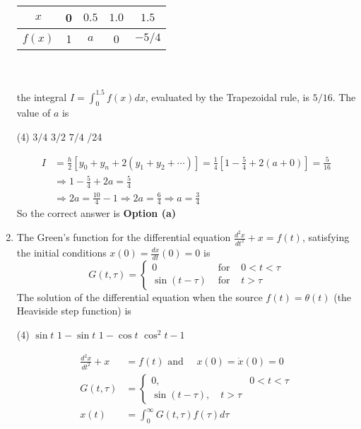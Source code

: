 \begin{enumerate}
\begin{tabular}{|c|c|c|c|c|}
	\hline$x$ & 0 & $0.5$ & $1.0$ & $1.5$ \\
	\hline$f(x)$ & 1 & $a$ & 0 & $-5 / 4$ \\
	\hline
\end{tabular}\\\\
the integral $I=\int_{0}^{1.5} f(x) d x$, evaluated by the Trapezoidal rule, is $5 / 16$. The value of $a$ is
 \begin{tasks}(4)
	\task[\textbf{a.}]$3 / 4$
	\task[\textbf{b.}]$3 / 2$
	\task[\textbf{c.}] $7 / 4$
	/24
\end{tasks}
\begin{answer}
	\begin{align*}
	I&=\frac{h}{2}\left[y_{0}+y_{n}+2\left(y_{1}+y_{2}+\cdots\right)\right]=\frac{1}{4}\left[1-\frac{5}{4}+2(a+0)\right]=\frac{5}{16}\\
	&\Rightarrow 1-\frac{5}{4}+2 a=\frac{5}{4} \\
	&\Rightarrow 2 a=\frac{10}{4}-1 \Rightarrow 2 a=\frac{6}{4} \Rightarrow a=\frac{3}{4}
	\end{align*}
		So the correct answer is \textbf{Option (a)}
\end{answer}
\item The Green's function for the differential equation $\frac{d^{2} x}{d t^{2}}+x=f(t)$, satisfying the initial conditions $x(0)=\frac{d x}{d t}(0)=0$ is
$$
G(t, \tau)=\left\{\begin{array}{llc}
0 & \text { for } & 0<t<\tau \\
\sin (t-\tau) & \text { for } & t>\tau
\end{array}\right.
$$
The solution of the differential equation when the source $f(t)=\theta(t)$ (the Heaviside step function) is
 \begin{tasks}(4)
	\task[\textbf{a.}]$\sin t$
	\task[\textbf{b.}]$1-\sin t$
	\task[\textbf{c.}]$1-\cos t$
	\task[\textbf{d.}]$\cos ^{2} t-1$ 
\end{tasks}
\begin{answer}
	\begin{align*}
	\frac{d^{2} x}{d t^{2}}+x&=f(t) \text { and } \quad x(0)=\dot{x}(0)=0\\
	G(t, \tau)&= \begin{cases}0, & 0<t<\tau \\
	\sin (t-\tau), \quad t>\tau\end{cases} \\
	x(t)&=\int_{0}^{\infty} G(t, \tau) f(\tau) d \tau \\

\end{align*}
\end{answer}
\end{enumerate}

